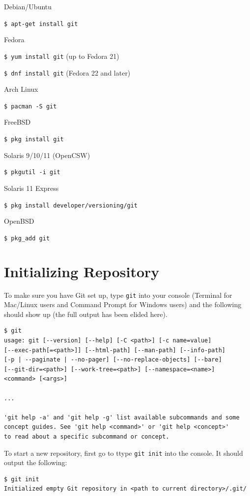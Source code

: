 \documentclass[12pt]{report}
\renewcommand\section[1]{{\chapter{#1}}}
\begin{document}
Debian/Ubuntu

\verb|$ apt-get install git|

\bigskip

Fedora

\verb|$ yum install git| (up to Fedora 21)

\verb|$ dnf install git| (Fedora 22 and later)

\bigskip

Arch Linux

\verb|$ pacman -S git|

\bigskip

FreeBSD

\verb|$ pkg install git|

\bigskip

Solaris 9/10/11 (OpenCSW)

\verb|$ pkgutil -i git|

\bigskip

Solaris 11 Express

\verb|$ pkg install developer/versioning/git|

\bigskip

OpenBSD

\verb|$ pkg_add git|


\section{Initializing Repository}

To make sure you have Git set up, type \verb|git| into your console (Terminal for Mac/Linux users and Command Prompt for Windows users) and the following should show up (the full output has been elided here).

\begin{verbatim}
$ git
usage: git [--version] [--help] [-C <path>] [-c name=value]
[--exec-path[=<path>]] [--html-path] [--man-path] [--info-path]
[-p | --paginate | --no-pager] [--no-replace-objects] [--bare]
[--git-dir=<path>] [--work-tree=<path>] [--namespace=<name>]
<command> [<args>]

...

'git help -a' and 'git help -g' list available subcommands and some
concept guides. See 'git help <command>' or 'git help <concept>'
to read about a specific subcommand or concept.
\end{verbatim}
\bigskip
\noindent
To start a new repository, first go to ttype \verb|git init| into the console. It should output the following:

\begin{verbatim}
$ git init
Initialized empty Git repository in <path to current directory>/.git/
\end{verbatim}
\end{document}
